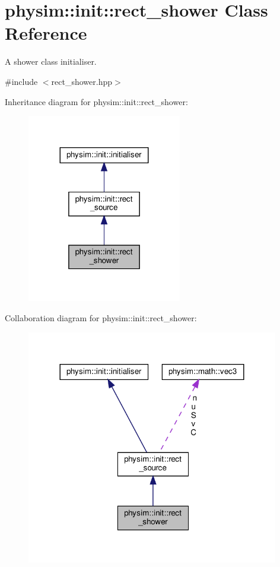 \hypertarget{classphysim_1_1init_1_1rect__shower}{}\section{physim\+:\+:init\+:\+:rect\+\_\+shower Class Reference}
\label{classphysim_1_1init_1_1rect__shower}


A shower class initialiser.  




{\ttfamily \#include $<$rect\+\_\+shower.\+hpp$>$}



Inheritance diagram for physim\+:\+:init\+:\+:rect\+\_\+shower\+:\nopagebreak
\begin{figure}[H]
\begin{center}
\leavevmode
\includegraphics[width=191pt]{classphysim_1_1init_1_1rect__shower__inherit__graph}
\end{center}
\end{figure}


Collaboration diagram for physim\+:\+:init\+:\+:rect\+\_\+shower\+:\nopagebreak
\begin{figure}[H]
\begin{center}
\leavevmode
\includegraphics[width=312pt]{classphysim_1_1init_1_1rect__shower__coll__graph}
\end{center}
\end{figure}
